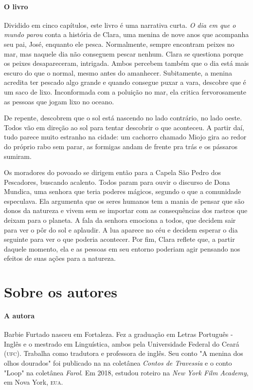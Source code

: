 \documentclass[11pt]{extarticle}
\begin{document}
\paragraph{O livro} Dividido em cinco capítulos, este livro é uma narrativa curta. \textit{O dia em que o mundo parou} conta a história de Clara, uma menina de nove anos que acompanha seu pai, José, enquanto ele pesca. Normalmente, sempre encontram peixes no mar, mas naquele dia não conseguem pescar nenhum. Clara se questiona porque os peixes desapareceram, intrigada. Ambos percebem também que o dia está mais escuro do que o normal, mesmo antes do amanhecer. Subitamente, a menina acredita ter pescado algo grande e quando consegue puxar a vara, descobre que é um saco de lixo. Inconformada com a poluição no mar, ela critica fervorosamente as pessoas que jogam lixo no oceano. 

De repente, descobrem que o sol está nascendo no lado contrário, no lado oeste. Todos vão em direção ao sol para tentar descobrir o que aconteceu. A partir daí, tudo parece muito estranho na cidade: um cachorro chamado Miojo gira ao redor do próprio rabo sem parar, as formigas andam de frente pra trás e os pássaros sumiram.

Os moradores do povoado se dirigem então para a Capela São Pedro dos Pescadores, buscando acalento. Todos param para ouvir o discurso de Dona Mundica, uma senhora que teria poderes mágicos, segundo o que a comunidade especulava. Ela argumenta que os seres humanos tem a mania de pensar que são donos da natureza e vivem sem se importar com as consequências dos rastros que deixam para o planeta. A fala da senhora emociona a todos, que decidem sair para ver o pôr do sol e aplaudir. A lua aparece no céu e decidem esperar o dia seguinte para ver o que poderia acontecer. Por fim, Clara reflete que, a partir daquele momento, ela e as pessoas em seu entorno poderiam agir pensando nos efeitos de suas ações para a natureza.

\section{Sobre os autores}

\paragraph{A autora} Barbie Furtado nasceu em Fortaleza. Fez a graduação em Letras Português - Inglês e o mestrado em Linguística, ambos pela Universidade Federal do Ceará (\textsc{ufc}). Trabalha como tradutora e professora de inglês. Seu conto "A menina dos olhos dourados" foi publicado na na coletânea \textit{Contos de Travessia} e o conto "Loop" na coletânea \textit{Farol}. Em 2018, estudou roteiro na \textit{New York Film Academy}, em Nova York, \textsc{eua}. 
\end{document}
